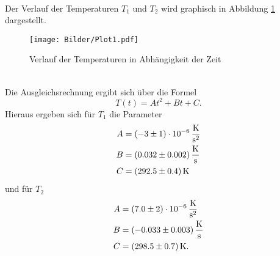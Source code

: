\\
Der Verlauf der Temperaturen $T_1$ und $T_2$ wird graphisch in Abbildung
\ref{fig:T1T2} dargestellt.
\begin{figure}[h]
  \centering
  \texttt{[image: Bilder/Plot1.pdf]}
  \caption{Verlauf der Temperaturen in Abhängigkeit der Zeit}
  \label{fig:T1T2}
\end{figure}
\\
Die Ausgleichsrechnung ergibt sich über die Formel
\begin{equation*}
  T(t) = At^2+Bt+C.
\end{equation*}
Hieraus ergeben sich für $T_1$ die Parameter
\begin{align*}
  A &= (-3 \pm 1) \cdot10^{-6}\,\si{\kelvin\per\square\second} \\
  B &= (0.032 \pm 0.002) \,\si{\kelvin\per\second} \\
  C &= (292.5 \pm 0.4) \,\si{\kelvin}
\end{align*}
und für $T_2$
\begin{align*}
  A &= (7.0 \pm 2) \cdot 10^{-6} \,\si{\kelvin\per\square\second}\\
  B &= (-0.033 \pm 0.003)  \,\si{\kelvin\per\second} \\
  C &= (298.5 \pm 0.7) \,\si{\kelvin}.
\end{align*}

